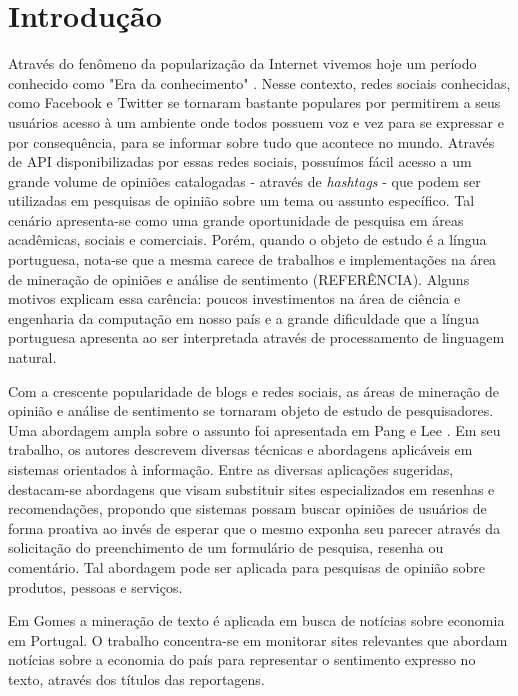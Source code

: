\chapter{Introdução} \label{cap:1}

Através do fenômeno da popularização da Internet vivemos hoje um período conhecido como "Era da conhecimento" \cite{lastres1999informaccao}.
Nesse contexto, redes sociais conhecidas, como Facebook e Twitter se tornaram bastante populares por permitirem a seus usuários acesso à um ambiente onde todos possuem voz e vez para se expressar e por consequência, para se informar sobre tudo que acontece no mundo.
Através de \ac{API} disponibilizadas por essas redes sociais, possuímos fácil acesso a um grande volume de opiniões catalogadas - através de \textit{hashtags} - que podem ser utilizadas em pesquisas de opinião sobre um tema ou assunto específico. Tal cenário apresenta-se como uma grande oportunidade de pesquisa em áreas acadêmicas, sociais e comerciais.
Porém, quando o objeto de estudo é a língua portuguesa, nota-se que a mesma carece de trabalhos e implementações na área de mineração de opiniões e análise de sentimento (REFERÊNCIA). Alguns motivos explicam essa carência: poucos investimentos na área de ciência e engenharia da computação em nosso país e a grande dificuldade que a língua portuguesa apresenta ao ser interpretada através de processamento de linguagem natural. \cite{santos2000projecto}

Com a crescente popularidade de blogs e redes sociais, as áreas de mineração de opinião e análise de sentimento se tornaram objeto de estudo de pesquisadores. Uma abordagem ampla sobre o assunto foi apresentada em Pang e Lee \cite{pang2008opinion}. Em seu trabalho, os autores descrevem diversas técnicas e abordagens aplicáveis em sistemas orientados à informação. Entre as diversas aplicações sugeridas, destacam-se abordagens que visam substituir sites especializados em resenhas e recomendações, propondo que sistemas possam buscar opiniões de usuários de forma proativa ao invés de esperar que o mesmo exponha seu parecer através da solicitação do preenchimento de um formulário de pesquisa, resenha ou comentário. Tal abordagem pode ser aplicada para pesquisas de opinião sobre produtos, pessoas e serviços.

Em Gomes \cite{gomes2013text} a mineração de texto é aplicada em busca de notícias sobre economia em Portugal. O trabalho concentra-se em monitorar sites relevantes que abordam notícias sobre a economia do país para representar o sentimento expresso no texto, através dos títulos das reportagens.

